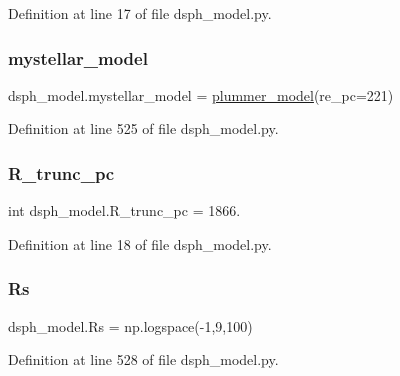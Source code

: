 Definition at line 17 of file dsph\+\_\+model.\+py.

\mbox{\label{namespacedsph__model_af9dc9391755a4aee2481a666d18e218a}} 
\subsubsection{\texorpdfstring{mystellar\+\_\+model}{mystellar\_model}}
{\footnotesize\ttfamily dsph\+\_\+model.\+mystellar\+\_\+model = \hyperlink{classdsph__model_1_1plummer__model}{plummer\+\_\+model}(re\+\_\+pc=221)}



Definition at line 525 of file dsph\+\_\+model.\+py.

\mbox{\label{namespacedsph__model_a03ec56ecf56f64e59a6be020a76a36f1}} 
\subsubsection{\texorpdfstring{R\+\_\+trunc\+\_\+pc}{R\_trunc\_pc}}
{\footnotesize\ttfamily int dsph\+\_\+model.\+R\+\_\+trunc\+\_\+pc = 1866.}



Definition at line 18 of file dsph\+\_\+model.\+py.

\mbox{\label{namespacedsph__model_af25a421d0de32d247b1aa0e8cf4894e3}} 
\subsubsection{\texorpdfstring{Rs}{Rs}}
{\footnotesize\ttfamily dsph\+\_\+model.\+Rs = np.\+logspace(-\/1,9,100)}



Definition at line 528 of file dsph\+\_\+model.\+py.

\mbox{\label{namespacedsph__model_a47e0439ddc091a015abf3612c9ee26c3}} 
